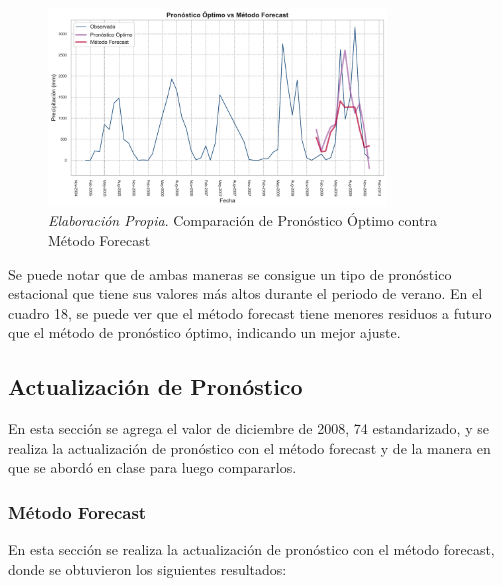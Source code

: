 \documentclass[12pt,letterpaper]{article}   %
\begin{document}
\begin{figure}[ht]
    \centering
    \includegraphics[width=0.8\textwidth]{imagenes/05-04-comparacion.pdf}
    \caption{\textit{Elaboración Propia}. Comparación de Pronóstico Óptimo contra Método Forecast}
\end{figure}

Se puede notar que de ambas maneras se consigue un tipo de pronóstico estacional que tiene sus valores más altos durante el periodo de verano. En el cuadro 18, se puede ver que el método forecast tiene menores residuos a futuro que el método de pronóstico óptimo, indicando un mejor ajuste.






  
\newpage

\subsection{Actualización de Pronóstico}
En esta sección se agrega el valor de diciembre de 2008, 74 estandarizado, y se realiza la actualización de pronóstico con el método forecast y de la manera en que se abordó en clase para luego compararlos.









\subsubsection{Método Forecast}

En esta sección se realiza la actualización de pronóstico con el método forecast, donde se obtuvieron los siguientes resultados:
\end{document}
